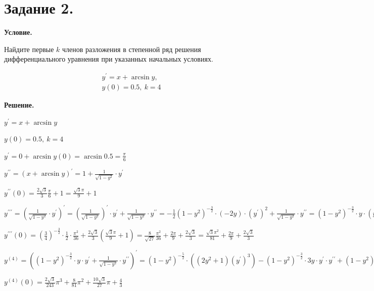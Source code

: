 \section{Задание 2.}

\textbf{Условие.}

Найдите первые $k$ членов разложения в степенной ряд решения дифференциального уравнения при указанных 
начальных условиях. 

\begin{gather*}
    y^\prime = x + \arcsin y, \\
    y(0) = 0.5, \ k = 4
\end{gather*}

\vspace{10mm}

\textbf{Решение.}

$y^\prime = x + \arcsin y$

$y(0) = 0.5, \ k = 4$

$y^\prime = 0 + \arcsin y(0) = \arcsin 0.5 = \frac{\pi}{6}$

$y^{\prime\prime} = (x + \arcsin y)^\prime = 1 + \frac{1}{\sqrt{1 - y^2}} \cdot y^\prime$

$y^{\prime\prime}(0) = \frac{2\sqrt{3}}{3} \frac{\pi}{6} + 1 = \frac{\sqrt{3}\pi}{9} + 1$

$y^{\prime\prime\prime} = \left(\frac{1}{\sqrt{1 - y^2}} \cdot y^\prime\right)^\prime = 
\left(\frac{1}{\sqrt{1 - y^2}}\right)^\prime \cdot y^\prime + \frac{1}{\sqrt{1 - y^2}} \cdot y^{\prime\prime} = 
-\frac{1}{2} (1 - y^2)^{-\frac{3}{2}} \cdot (-2y) \cdot (y^\prime)^2 + \frac{1}{\sqrt{1 - y^2}} \cdot y^{\prime\prime}  = 
(1 - y^2)^{-\frac{3}{2}} \cdot y \cdot (y^\prime)^2 + \frac{1}{\sqrt{1 - y^2}} \cdot y^{\prime\prime}
$

$y^{\prime\prime\prime}(0) = \left(\frac{3}{4}\right)^{-\frac{3}{2}} \cdot \frac{1}{2} \cdot \frac{\pi^2}{36} + \frac{2\sqrt{3}}{3} (\frac{\sqrt{3}\pi}{9} + 1) = 
\frac{8}{\sqrt{27}}\frac{\pi^2}{36} + \frac{2\pi}{9} + \frac{2\sqrt{3}}{3} = \frac{\sqrt{3}\pi^2}{81} + \frac{2\pi}{9} + \frac{2\sqrt{3}}{3}$

$y^{(4)} = \left((1 - y^2)^{-\frac{3}{2}} \cdot y \cdot y^\prime + \frac{1}{\sqrt{1 - y^2}} \cdot y^{\prime\prime}\right)^\prime = 
(1 - y^2)^{-\frac{5}{2}} \cdot ((2y^2 + 1) (y^\prime)^3) - (1 - y^2)^{-\frac{3}{2}} \cdot 3y \cdot y^\prime \cdot y^{\prime\prime} + (1 - y^2)^{-\frac{1}{2}} y^{\prime\prime\prime}$

$y^{(4)}(0) = \frac{2\sqrt{3}}{243}\pi^3 + \frac{8}{81}\pi^2 + \frac{10\sqrt{3}}{27} \pi + \frac{4}{3}$

